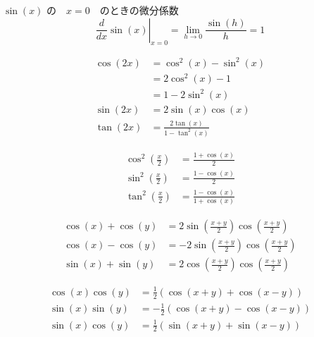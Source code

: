 \documentclass{book} %
\begin{document}
				\begin{thm} $\sin(x)$ の　$x=0$　のときの微分係数
					\begin{equation}
						\left. \frac{d}{dx} \sin(x)\right\lvert_{x=0} = \lim_{h \to 0} \frac{ \sin(h)} {h} = 1
					\end{equation}
				\end{thm}
			
				\begin{thm}[倍角の公式]
					\begin{align}
						\cos(2x) &= \cos^2(x) - \sin^2(x) \\
						              &= 2 \cos^2(x) -1 \\
						              &= 1 -2 \sin^2(x) \\
						\sin(2x) &= 2\sin(x)\cos(x) \\
						\tan(2x) &= \frac{2\tan(x)} {1 - \tan^2(x)} 
					\end{align}
				\end{thm}
			
				\begin{thm}[半角の公式]
					\begin{align}
						\cos^2 \left( \frac{x}{2} \right) &= \frac{1 + \cos(x)}{2} \\
						\sin^2 \left( \frac{x}{2} \right) &= \frac{1 - \cos(x)}{2} \\
						\tan^2 \left( \frac{x}{2} \right) &= \frac{1 - \cos(x)} {1 + \cos(x)}
					\end{align}
				\end{thm}
			
				\begin{thm}[和積公式]
					\begin{align}
						\cos(x) + \cos(y) &= 2 \sin \left( \frac{x+y}{2} \right) \cos \left( \frac{x+y}{2} \right) \\
						\cos(x) - \cos(y) &= -2 \sin \left( \frac{x+y}{2} \right) \cos \left( \frac{x+y}{2} \right) \\
						\sin(x) + \sin(y) &= 2 \cos \left( \frac{x+y}{2} \right) \cos \left( \frac{x+y}{2} \right) 
					\end{align}
				\end{thm}
			
				\begin{thm}[積和公式]
						\begin{align}
							\cos(x) \cos(y) &= \frac{1}{2} (\cos(x+y) + \cos(x-y)) \\
							\sin(x) \sin(y) &= -\frac{1}{2} (\cos(x+y) - \cos(x-y)) \\
							\sin(x) \cos(y) &=  \frac{1}{2} (\sin(x+y) + \sin(x-y))
						\end{align}
				\end{thm}
			
\end{document}

